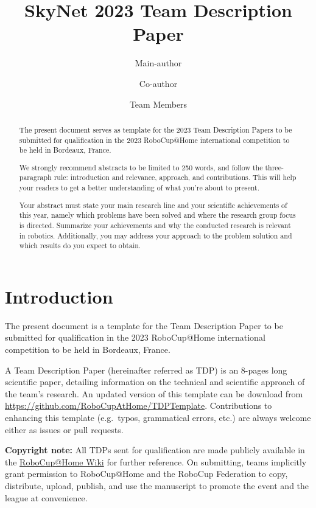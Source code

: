 \documentclass[runningheads,a4paper]{llncs}
\title{SkyNet 2023 Team Description Paper}
\author{Main-author \and Co-author \and Team Members}
\institute{Affiliation name and address, \\
\texttt{http://devoted-web-site.url}}
\begin{document}
\maketitle

%
%

\begin{abstract}
The present document serves as template for the 2023 Team Description Papers to be submitted for qualification in the 2023 RoboCup@Home international competition to be held in Bordeaux, France.

We strongly recommend abstracts to be limited to 250 words, and follow the three-paragraph rule: introduction and relevance, approach, and contributions. This will help your readers to get a better understanding of what you're about to present.

Your abstract must state your main research line and your scientific achievements of this year, namely which problems have been solved and where the research group focus is directed.
Summarize your achievements and why the conducted research is relevant in robotics.
Additionally, you may address your approach to the problem solution and which results do you expect to obtain.
\end{abstract}



\section{Introduction}
The present document is a template for the Team Description Paper to be submitted for qualification in the 2023 RoboCup@Home international competition to be held in Bordeaux, France.

A Team Description Paper (hereinafter referred as TDP) is an 8-pages long scientific paper, detailing information on the technical and scientific approach of the team's research.
An updated version of this template can be download from {\small\url{https://github.com/RoboCupAtHome/TDPTemplate}}.
Contributions to enhancing this template (e.g.~typos, grammatical errors, etc.) are always welcome either as issues or pull requests.

\textbf{Copyright note:} All TDPs sent for qualification are made publicly available in the \href{https://github.com/RoboCupAtHome/AtHomeCommunityWiki/wiki}{RoboCup@Home Wiki} for further reference.
On submitting, teams implicitly grant permission to RoboCup@Home and the RoboCup Federation to copy, distribute, upload, publish, and use the manuscript to promote the event and the league at convenience.
\end{document}
